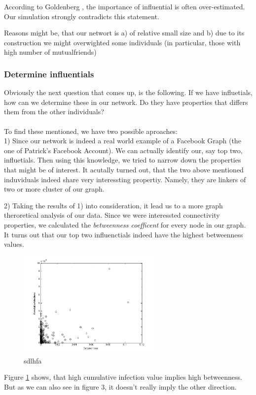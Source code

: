 According to Goldenberg \cite{word2mouth}, the importance of influential is often over-estimated. Our simulation strongly contradicts this statement. 

Reasons might be, that our networt is a) of relative small size and b) due to its construction we might overwighted some individuals (in particular, those with high number of mutualfriends)


\subsubsection{Determine influentials}

Obviously the next question that comes up, is the following. If we have influetials, how can we determine these in our network. Do they have properties that differs them from the other individuals? \\ 
\\
To find these mentioned, we have two possible aproaches: 
\\

1) Since our network is indeed a real world example of a Facebook Graph (the one of Patrick's Facebook Account). We can actually identify our, say top two, influetials. Then using this knowledge, we tried to narrow down the properties that might be of interest. 
It acutally turned out, that the two above mentioned induviduals indeed share very interessting propertiy. Namely, they are linkers of two or more cluster of our graph. 

2) Taking the results of 1) into consideration, it lead us to a more graph theroretical analysis of our data. Since we were interessted connectivity properties, we calculated the \textit{betweenness coefficent} for every node in our graph. 
It turns out that our top two influenctials indeed have the highest betweenness values. 

\begin{figure}
\includegraphics[width=7cm]{influ4}
\caption{sdlhfa}
\label{Betweenness}
\end{figure}

Figure \ref{Betweenness} shows, that high cumulative infection value implies high betweenness. But as we can also see in figure 3, it doesn't really imply the other direction.



